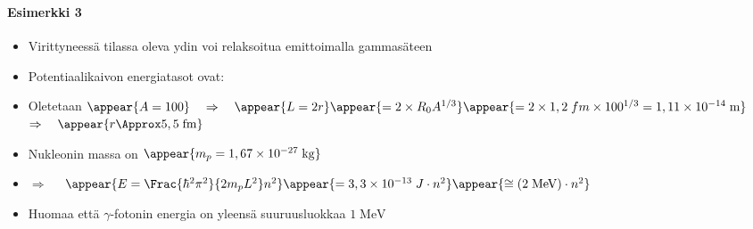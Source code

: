 \begin{frame}
\frametitle{\texorpdfstring{\culine[\sectiontitleulinecolor]{\sectiontitle}}{\sectiontitle} }
\framesubtitle{Esimerkki 3}
%
\appear{}

\begin{itemize}
	\item Virittyneessä tilassa oleva ydin voi relaksoitua emittoimalla gammasäteen   

\item Potentiaalikaivon energiatasot ovat: 

\item Oletetaan $\appear{A=100} \quad \Rightarrow \quad \appear{L=2 r}\appear{=2 \times R_{0} A^{1 / 3}}\appear{=2 \times 1,2 \;fm \times 100^{1 / 3}=1,11 \times 10^{-14} \mathrm{\;m}}$ \\
$\Rightarrow \quad \appear{r \Approx 5,5 \mathrm{\;fm}}$

\item Nukleonin massa on $\appear{m_{p}=1,67 \times 10^{-27} \mathrm{\;kg} }$

\item[] $\Rightarrow$  $\quad \appear{E=\Frac{\hbar^{2} \pi^{2}}{2 m_{p} L^{2}} n^{2}}\appear{=3,3 \times 10^{-13} \;J \cdot n^{2}} \appear{\cong(2 \mathrm{\;MeV}) \cdot n^{2}}$

\item Huomaa että $\gamma$-fotonin energia on yleensä suuruusluokkaa $1 \mathrm{\;MeV}$
\end{itemize}

\endofsection
\end{frame}

